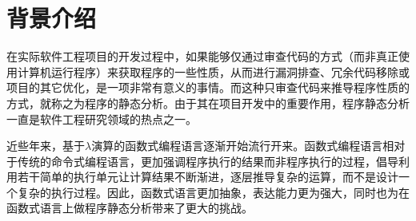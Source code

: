 \documentclass[12pt, titlepage]{article}
\begin{document}
	\section{背景介绍}
	在实际软件工程项目的开发过程中，如果能够仅通过审查代码的方式（而非真正使用计算机运行程序）来获取程序的一些性质，从而进行漏洞排查、冗余代码移除或项目的其它优化，是一项非常有意义的事情。而这种只审查代码来推导程序性质的方式，就称之为程序的静态分析。由于其在项目开发中的重要作用，程序静态分析一直是软件工程研究领域的热点之一。
	
	近些年来，基于$\lambda$演算的函数式编程语言逐渐开始流行开来。函数式编程语言相对于传统的命令式编程语言，更加强调程序执行的结果而非程序执行的过程，倡导利用若干简单的执行单元让计算结果不断渐进，逐层推导复杂的运算，而不是设计一个复杂的执行过程。因此，函数式语言更加抽象，表达能力更为强大，同时也为在函数式语言上做程序静态分析带来了更大的挑战。
	
\end{document}

